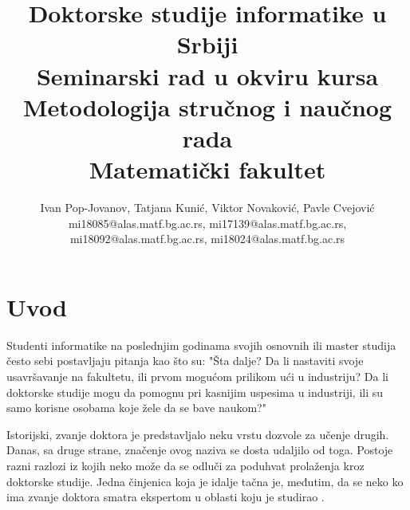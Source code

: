 \documentclass[a4paper]{article}
\begin{document}
\title{Doktorske studije informatike u Srbiji\\ \small{Seminarski rad u okviru kursa\\Metodologija stručnog i naučnog rada\\ Matematički fakultet}}

\author{Ivan Pop-Jovanov, Tatjana Kunić, Viktor Novaković, Pavle Cvejović\\ mi18085@alas.matf.bg.ac.rs, mi17139@alas.matf.bg.ac.rs, \\mi18092@alas.matf.bg.ac.rs, mi18024@alas.matf.bg.ac.rs}


\maketitle


\tableofcontents

\newpage

\section{Uvod}
\label{sec:uvod}

Studenti informatike na poslednjim godinama svojih osnovnih ili master studija često sebi postavljaju pitanja kao što su: "Šta dalje? Da li nastaviti svoje usavršavanje na fakultetu, ili prvom mogućom prilikom ući u industriju? Da li doktorske studije mogu da pomognu pri kasnijim uspesima u industriji, ili su samo korisne osobama koje žele da se bave naukom?" 

Istorijski, zvanje doktora je predstavljalo neku vrstu dozvole za učenje drugih. Danas, sa druge strane, značenje ovog naziva se dosta udaljilo od toga. Postoje razni razlozi iz kojih neko može da se odluči za poduhvat prolaženja kroz doktorske studije. Jedna činjenica koja je idalje tačna je, međutim, da se neko ko ima zvanje doktora smatra ekspertom u oblasti koju je studirao \cite{phillips2010get}.
\end{document}

